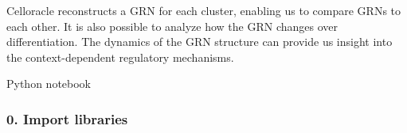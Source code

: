 \documentclass[letterpaper,10pt,english]{sphinxmanual}
\begin{document}
Celloracle reconstructs a GRN for each cluster, enabling us to compare GRNs to each other. It is also possible to analyze how the GRN changes over differentiation.
The dynamics of the GRN structure can provide us insight into the
context-dependent regulatory mechanisms.

Python notebook


\subsubsection{0. Import libraries}
\label{\detokenize{notebooks/04_Network_analysis/Network_analysis_with_with_Paul_etal_2015_data:0.-Import-libraries}}\label{\detokenize{notebooks/04_Network_analysis/Network_analysis_with_with_Paul_etal_2015_data::doc}}
{
\begin{sphinxVerbatim}[commandchars=\\\{\}]
\llap{\color{nbsphinxin}[1]:\,\hspace{\fboxrule}\hspace{\fboxsep}}

 
 

   
   
   
   
   

\end{sphinxVerbatim}
}

{
\begin{sphinxVerbatim}[commandchars=\\\{\}]
\llap{\color{nbsphinxin}[2]:\,\hspace{\fboxrule}\hspace{\fboxsep}}   
\end{sphinxVerbatim}
}
\end{document}
